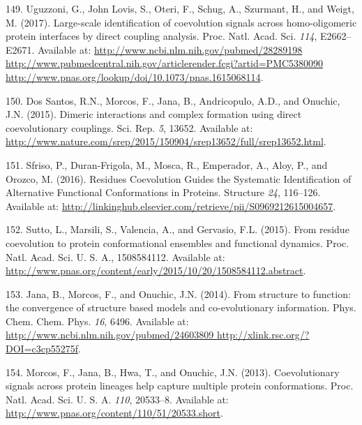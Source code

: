 \documentclass[11pt,a4paper,twoside]{book}
\theoremstyle{definition}
\theoremstyle{definition}
\theoremstyle{remark}
\begin{document}
\hypertarget{ref-Uguzzoni2017}{}
149. Uguzzoni, G., John Lovis, S., Oteri, F., Schug, A., Szurmant, H.,
and Weigt, M. (2017). Large-scale identification of coevolution signals
across homo-oligomeric protein interfaces by direct coupling analysis.
Proc. Natl. Acad. Sci. \emph{114}, E2662--E2671. Available at:
\href{http://www.ncbi.nlm.nih.gov/pubmed/28289198\%20http://www.pubmedcentral.nih.gov/articlerender.fcgi?artid=PMC5380090\%20http://www.pnas.org/lookup/doi/10.1073/pnas.1615068114}{http://www.ncbi.nlm.nih.gov/pubmed/28289198 http://www.pubmedcentral.nih.gov/articlerender.fcgi?artid=PMC5380090 http://www.pnas.org/lookup/doi/10.1073/pnas.1615068114}.

\hypertarget{ref-DosSantos2015a}{}
150. Dos Santos, R.N., Morcos, F., Jana, B., Andricopulo, A.D., and
Onuchic, J.N. (2015). Dimeric interactions and complex formation using
direct coevolutionary couplings. Sci. Rep. \emph{5}, 13652. Available
at:
\url{http://www.nature.com/srep/2015/150904/srep13652/full/srep13652.html}.

\hypertarget{ref-Sfriso2016}{}
151. Sfriso, P., Duran-Frigola, M., Mosca, R., Emperador, A., Aloy, P.,
and Orozco, M. (2016). Residues Coevolution Guides the Systematic
Identification of Alternative Functional Conformations in Proteins.
Structure \emph{24}, 116--126. Available at:
\url{http://linkinghub.elsevier.com/retrieve/pii/S0969212615004657}.

\hypertarget{ref-Sutto2015}{}
152. Sutto, L., Marsili, S., Valencia, A., and Gervasio, F.L. (2015).
From residue coevolution to protein conformational ensembles and
functional dynamics. Proc. Natl. Acad. Sci. U. S. A., 1508584112.
Available at:
\url{http://www.pnas.org/content/early/2015/10/20/1508584112.abstract}.

\hypertarget{ref-Jana2014}{}
153. Jana, B., Morcos, F., and Onuchic, J.N. (2014). From structure to
function: the convergence of structure based models and co-evolutionary
information. Phys. Chem. Chem. Phys. \emph{16}, 6496. Available at:
\href{http://www.ncbi.nlm.nih.gov/pubmed/24603809\%20http://xlink.rsc.org/?DOI=c3cp55275f}{http://www.ncbi.nlm.nih.gov/pubmed/24603809 http://xlink.rsc.org/?DOI=c3cp55275f}.

\hypertarget{ref-Morcos2013a}{}
154. Morcos, F., Jana, B., Hwa, T., and Onuchic, J.N. (2013).
Coevolutionary signals across protein lineages help capture multiple
protein conformations. Proc. Natl. Acad. Sci. U. S. A. \emph{110},
20533--8. Available at:
\url{http://www.pnas.org/content/110/51/20533.short}.
\end{document}
